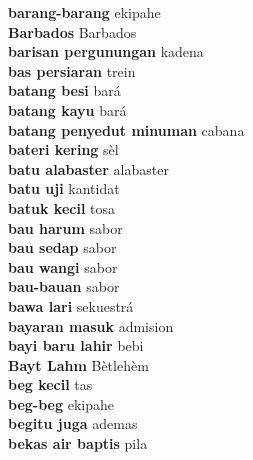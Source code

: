 \textbf{ barang-barang  } ekipahe \\
\textbf{ Barbados  } Barbados \\
\textbf{ barisan pergunungan  } kadena \\
\textbf{ bas persiaran  } trein \\
\textbf{ batang besi  } bará \\
\textbf{ batang kayu  } bará \\
\textbf{ batang penyedut minuman  } cabana \\
\textbf{ bateri kering  } sèl \\
\textbf{ batu alabaster  } alabaster \\
\textbf{ batu uji  } kantidat \\
\textbf{ batuk kecil  } tosa \\
\textbf{ bau harum  } sabor \\
\textbf{ bau sedap  } sabor \\
\textbf{ bau wangi  } sabor \\
\textbf{ bau-bauan  } sabor \\
\textbf{ bawa lari  } sekuestrá \\
\textbf{ bayaran masuk  } admision \\
\textbf{ bayi baru lahir  } bebi \\
\textbf{ Bayt Lahm  } Bètlehèm \\
\textbf{ beg kecil  } tas \\
\textbf{ beg-beg  } ekipahe \\
\textbf{ begitu juga  } ademas \\
\textbf{ bekas air baptis  } pila \\
